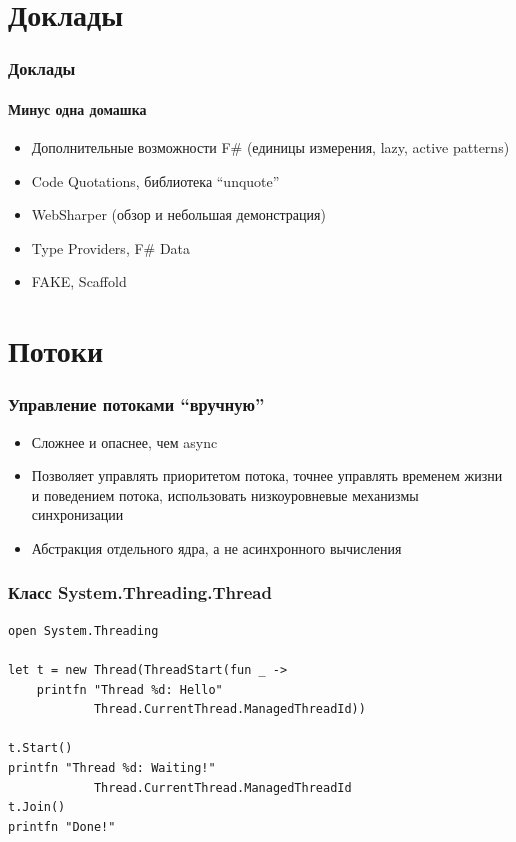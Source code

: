 \documentclass[xetex,mathserif,serif]{beamer}
\begin{document}
	\section{Доклады}

	\begin{frame}
		\frametitle{Доклады}
		\framesubtitle{Минус одна домашка}
		\begin{itemize}
			\item Дополнительные возможности F\# (единицы измерения, lazy, active patterns)
			\item Code Quotations, библиотека ``unquote''
			\item WebSharper (обзор и небольшая демонстрация)
			\item Type Providers, F\# Data
			\item FAKE, Scaffold
		\end{itemize}
	\end{frame}

	\section{Потоки}

	\begin{frame}
		\frametitle{Управление потоками ``вручную''}
		\begin{itemize}
			\item Сложнее и опаснее, чем async
			\item Позволяет управлять приоритетом потока, точнее управлять временем жизни и поведением потока, использовать низкоуровневые механизмы синхронизации
			\item Абстракция отдельного ядра, а не асинхронного вычисления
		\end{itemize}
	\end{frame}

	\begin{frame}[fragile]
		\frametitle{Класс System.Threading.Thread}
		\begin{verbatim}
open System.Threading

let t = new Thread(ThreadStart(fun _ ->
    printfn "Thread %d: Hello" 
            Thread.CurrentThread.ManagedThreadId))

t.Start()
printfn "Thread %d: Waiting!" 
            Thread.CurrentThread.ManagedThreadId
t.Join()
printfn "Done!"
		\end{verbatim}
\end{frame}
\end{document}
